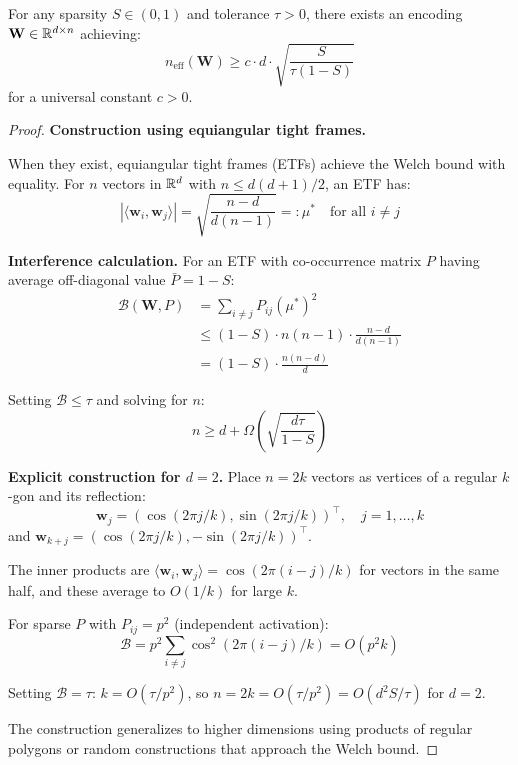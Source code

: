 \begin{theorem}
\label{thm:capacity_lower}
For any sparsity $S \in (0,1)$ and tolerance $\tau > 0$, there exists an encoding $\mathbf{W} \in \mathbb{R}^{d \times n}$ achieving:
\begin{equation}
n_{\text{eff}}(\mathbf{W}) \geq c \cdot d \cdot \sqrt{\frac{S}{\tau(1-S)}}
\label{eq:capacity_lower}
\end{equation}
for a universal constant $c > 0$.
\end{theorem}

\begin{proof}
\textbf{Construction using equiangular tight frames.}

When they exist, equiangular tight frames (ETFs) achieve the Welch bound with equality. For $n$ vectors in $\mathbb{R}^d$ with $n \leq d(d+1)/2$, an ETF has:
\begin{equation}
|\langle \mathbf{w}_i, \mathbf{w}_j \rangle| = \sqrt{\frac{n-d}{d(n-1)}} =: \mu^* \quad \text{for all } i \neq j
\end{equation}

\textbf{Interference calculation.}
For an ETF with co-occurrence matrix $P$ having average off-diagonal value $\bar{P} = 1 - S$:
\begin{align}
\mathcal{B}(\mathbf{W}, P) &= \sum_{i \neq j} P_{ij} (\mu^*)^2 \\
&\leq (1-S) \cdot n(n-1) \cdot \frac{n-d}{d(n-1)} \\
&= (1-S) \cdot \frac{n(n-d)}{d}
\end{align}

Setting $\mathcal{B} \leq \tau$ and solving for $n$:
\begin{equation}
n \geq d + \Omega\left(\sqrt{\frac{d\tau}{1-S}}\right)
\end{equation}

\textbf{Explicit construction for $d = 2$.}
Place $n = 2k$ vectors as vertices of a regular $k$-gon and its reflection:
\begin{equation}
\mathbf{w}_j = (\cos(2\pi j/k), \sin(2\pi j/k))^\top, \quad j = 1, \ldots, k
\end{equation}
and $\mathbf{w}_{k+j} = (\cos(2\pi j/k), -\sin(2\pi j/k))^\top$.

The inner products are $\langle \mathbf{w}_i, \mathbf{w}_j \rangle = \cos(2\pi(i-j)/k)$ for vectors in the same half, and these average to $O(1/k)$ for large $k$.

For sparse $P$ with $P_{ij} = p^2$ (independent activation):
\begin{equation}
\mathcal{B} = p^2 \sum_{i \neq j} \cos^2(2\pi(i-j)/k) = O(p^2 k)
\end{equation}

Setting $\mathcal{B} = \tau$: $k = O(\tau/p^2)$, so $n = 2k = O(\tau/p^2) = O(d^2 S/\tau)$ for $d = 2$.

The construction generalizes to higher dimensions using products of regular polygons or random constructions that approach the Welch bound.
\end{proof}

